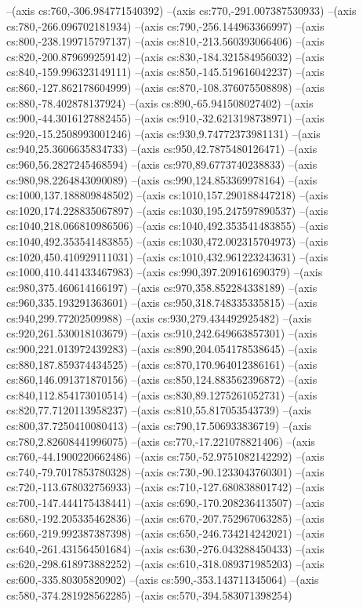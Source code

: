 --(axis cs:760,-306.984771540392)
--(axis cs:770,-291.007387530933)
--(axis cs:780,-266.096702181934)
--(axis cs:790,-256.144963366997)
--(axis cs:800,-238.199715797137)
--(axis cs:810,-213.560393066406)
--(axis cs:820,-200.879699259142)
--(axis cs:830,-184.321584956032)
--(axis cs:840,-159.996323149111)
--(axis cs:850,-145.519616042237)
--(axis cs:860,-127.862178604999)
--(axis cs:870,-108.376075508898)
--(axis cs:880,-78.402878137924)
--(axis cs:890,-65.941508027402)
--(axis cs:900,-44.3016127882455)
--(axis cs:910,-32.6213198738971)
--(axis cs:920,-15.2508993001246)
--(axis cs:930,9.74772373981131)
--(axis cs:940,25.3606635834733)
--(axis cs:950,42.7875480126471)
--(axis cs:960,56.2827245468594)
--(axis cs:970,89.6773740238833)
--(axis cs:980,98.2264843090089)
--(axis cs:990,124.853369978164)
--(axis cs:1000,137.188809848502)
--(axis cs:1010,157.290188447218)
--(axis cs:1020,174.228835067897)
--(axis cs:1030,195.247597890537)
--(axis cs:1040,218.066810986506)
--(axis cs:1040,492.353541483855)
--(axis cs:1040,492.353541483855)
--(axis cs:1030,472.002315704973)
--(axis cs:1020,450.410929111031)
--(axis cs:1010,432.961223243631)
--(axis cs:1000,410.441433467983)
--(axis cs:990,397.209161690379)
--(axis cs:980,375.460614166197)
--(axis cs:970,358.852284338189)
--(axis cs:960,335.193291363601)
--(axis cs:950,318.748335335815)
--(axis cs:940,299.77202509988)
--(axis cs:930,279.434492925482)
--(axis cs:920,261.530018103679)
--(axis cs:910,242.649663857301)
--(axis cs:900,221.013972439283)
--(axis cs:890,204.054178538645)
--(axis cs:880,187.859374434525)
--(axis cs:870,170.964012386161)
--(axis cs:860,146.091371870156)
--(axis cs:850,124.883562396872)
--(axis cs:840,112.854173010514)
--(axis cs:830,89.1275261052731)
--(axis cs:820,77.7120113958237)
--(axis cs:810,55.817053543739)
--(axis cs:800,37.7250410080413)
--(axis cs:790,17.506933836719)
--(axis cs:780,2.82608441996075)
--(axis cs:770,-17.221078821406)
--(axis cs:760,-44.1900220662486)
--(axis cs:750,-52.9751082142292)
--(axis cs:740,-79.7017853780328)
--(axis cs:730,-90.1233043760301)
--(axis cs:720,-113.678032756933)
--(axis cs:710,-127.680838801742)
--(axis cs:700,-147.444175438441)
--(axis cs:690,-170.208236413507)
--(axis cs:680,-192.205335462836)
--(axis cs:670,-207.752967063285)
--(axis cs:660,-219.992387387398)
--(axis cs:650,-246.734214242021)
--(axis cs:640,-261.431564501684)
--(axis cs:630,-276.043288450433)
--(axis cs:620,-298.618973882252)
--(axis cs:610,-318.089371985203)
--(axis cs:600,-335.80305820902)
--(axis cs:590,-353.143711345064)
--(axis cs:580,-374.281928562285)
--(axis cs:570,-394.583071398254)
